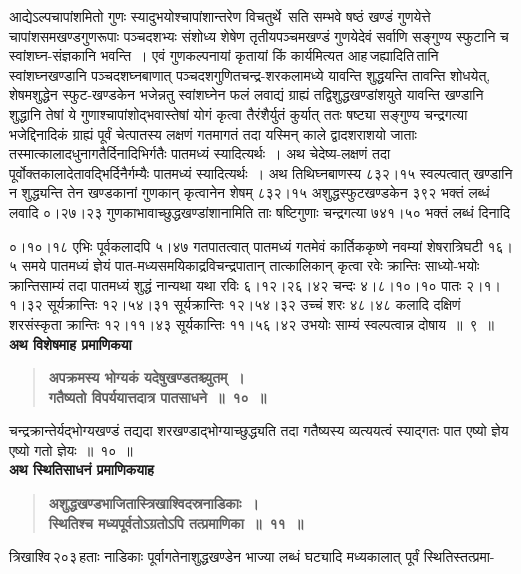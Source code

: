 \documentclass[11pt, openany]{book}
\begin{document}
\begin{sloppypar}
आद्येऽल्पचापांशमितो गुणः स्यादुभयोश्चापांशान्तरेण विचतुर्थे~सति सम्भवे षष्ठं खण्डं गुणयेत्ते चापांशसमखण्डगुणरूपाः पञ्चदशभ्यः संशोध्य शेषेण तृतीयपञ्चमखण्डं गुणयेदेवं सर्वाणि सङ्गुण्य स्फुटानि च स्वांशघ्न-संज्ञकानि भवन्ति~। एवं गुणकल्पनायां कृतायां किं कार्यमित्यत आह\textendash \,जह्यादिति\textendash \,तानि स्वांशघ्नखण्डानि पञ्चदशघ्नबाणात् पञ्चदशगुणितचन्द्र-शरकलामध्ये यावन्ति शुद्धयन्ति तावन्ति शोधयेत्, शेषमशुद्धेन स्फुट-खण्डकेन भजेन्नतु स्वांशघ्नेन फलं लवाद्यं ग्राह्यं तद्विशुद्धखण्डांशयुते यावन्ति खण्डानि शुद्धानि तेषां ये गुणाश्चापांशोद्भवास्तेषां योगं कृत्वा तैरंशैर्युतं कुर्यात् ततः षष्ट्या सङ्गुण्य चन्द्रगत्या भजेद्दिनादिकं ग्राह्यं पूर्वं चेत्पातस्य लक्षणं गतमागतं तदा यस्मिन् काले द्वादशराशयो जाताः तस्मात्कालादधुनागतैर्दिनादिभिर्गतैः पातमध्यं स्यादित्यर्थः~। अथ चेदेष्य-लक्षणं तदा पूर्वोक्तकालादेतावद्भिर्दिनैर्गम्यैः पातमध्यं स्यादित्यर्थः~। अथ तिथिघ्नबाणस्य ८३२।१५ स्वल्पत्वात् खण्डानि न शुद्ध्यन्ति तेन खण्डकानां गुणकान् कृत्वानेन शेषम् ८३२।१५ अशुद्धस्फुटखण्डकेन ३९२ भक्तं लब्धं लवादि ०।२७।२३ गुणकाभावाच्छुद्धखण्डांशानामिति ताः षष्टिगुणाः चन्द्रगत्या ७४१।५० भक्तं लब्धं दिनादि
\end{sloppypar}

\newpage

\begin{sloppypar}
\noindent ०।१०।१८ एभिः पूर्वकलादपि ५।४७ गतपातत्वात् पातमध्यं गतमेवं कार्तिककृष्णे नवम्यां शेषरात्रिघटी १६।५ समये पातमध्यं ज्ञेयं पात-मध्यसमयिकाद्रविचन्द्रपातान् तात्कालिकान् कृत्वा रवेः क्रान्तिः साध्यो-भयोः क्रान्तिसाम्यं तदा पातमध्यं शुद्धं नान्यथा यथा रविः ६।१२।२६।४२ चन्दः ४।८।१०।१० पातः २।१।१।३२ सूर्यक्रान्तिः १२।५४।३१ सूर्यक्रान्तिः १२।५४।३२ उच्चं शरः ४८।४८ कलादि दक्षिणं शरसंस्कृता क्रान्तिः १२।११।४३ सूर्यकान्तिः ११।५६।४२ उभयोः साम्यं स्वल्पत्वान्न दोषाय~॥~९~॥\\

{\small \textbf{अथ विशेषमाह प्रमाणिकया\textendash }}

 \label{9.10}
\begin{quote}
{\large \textbf{{\color{purple}अपक्रमस्य भोग्यकं यदेषुखण्डतश्च्युतम्~। \\
गतैष्यतो विपर्ययात्तदात्र पातसाधने~॥~१०~॥}}}
\end{quote}

चन्द्रक्रान्तेर्यद्भोग्यखण्डं तद्यदा शरखण्डाद्भोग्याच्छुद्ध्यति तदा गतैष्यस्य व्यत्ययत्वं स्याद्गतः पात एष्यो ज्ञेय एष्यो गतो ज्ञेयः~॥~१०~॥\\

{\small \textbf{अथ स्थितिसाधनं प्रमाणिकयाह\textendash }}

 \label{9.11}
\begin{quote}
{\large \textbf{{\color{purple}अशुद्धखण्डभाजितास्त्रिखाश्विदस्रनाडिकाः~। \\
स्थितिश्च मध्यपूर्वतोऽग्रतोऽपि तत्प्रमाणिका~॥~११~॥}}}
\end{quote}

त्रिखाश्वि\textendash \,२०३\textendash \,हताः नाडिकाः पूर्वागतेनाशुद्धखण्डेन भाज्या लब्धं घट्यादि मध्यकालात् पूर्वं स्थितिस्तत्प्रमा-
\end{sloppypar}
\end{document}
